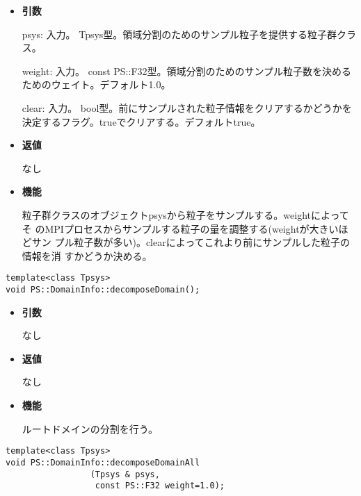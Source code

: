 \begin{itemize}

\item {\bf 引数}

psys: 入力。 Tpsys型。領域分割のためのサンプル粒子を提供する粒子群クラ
ス。

weight: 入力。 const PS::F32型。領域分割のためのサンプル粒子数を決める
ためのウェイト。デフォルト1.0。

clear: 入力。 bool型。前にサンプルされた粒子情報をクリアするかどうかを
決定するフラグ。trueでクリアする。デフォルトtrue。

\item {\bf 返値}

なし

\item {\bf 機能}

粒子群クラスのオブジェクトpsysから粒子をサンプルする。weightによってそ
のMPIプロセスからサンプルする粒子の量を調整する(weightが大きいほどサン
プル粒子数が多い)。clearによってこれより前にサンプルした粒子の情報を消
すかどうか決める。

\end{itemize}


\begin{screen}
\begin{verbatim}
template<class Tpsys>
void PS::DomainInfo::decomposeDomain();
\end{verbatim}
\end{screen}

\begin{itemize}

\item {\bf 引数}

なし

\item {\bf 返値}

なし

\item {\bf 機能}

ルートドメインの分割を行う。

\end{itemize}


\begin{screen}
\begin{verbatim}
template<class Tpsys>
void PS::DomainInfo::decomposeDomainAll
                 (Tpsys & psys,
                  const PS::F32 weight=1.0);
\end{verbatim}
\end{screen}

